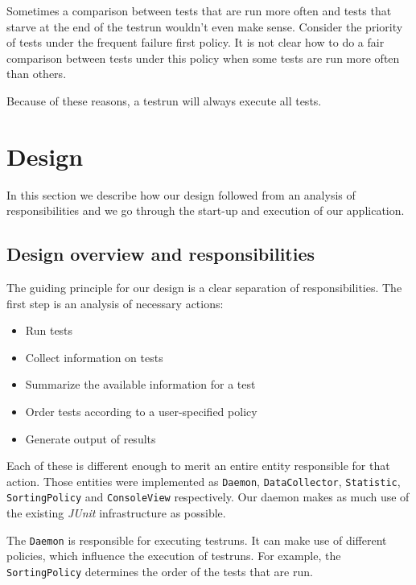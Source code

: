\documentclass[i2]{oss}
\newcommand{\class}[1]{\texttt{#1}}
\newcommand{\junit}{\emph{JUnit }}
\begin{document}
Sometimes a comparison between tests that are run more often and tests that starve at the end of the testrun wouldn't even make sense.
Consider the priority of tests under the frequent failure first policy.
It is not clear how to do a fair comparison between tests under this policy when some tests are run more often than others.

Because of these reasons, a testrun will always execute all tests.

\section{Design}
\label{ssec:design}

In this section we describe how our design followed from an analysis
of responsibilities and we go through the start-up and execution of 
our application.

\subsection{Design overview and responsibilities}
\label{subssec: Design overview}

The guiding principle for our design is a clear separation of 
responsibilities. The first step is an analysis of necessary actions:

\begin{itemize}
	\item Run tests
    \item Collect information on tests
    \item Summarize the available information for a test
    \item Order tests according to a user-specified policy
    \item Generate output of results
\end{itemize}

Each of these is different enough to merit an entire entity responsible 
for that action. Those entities were implemented as \class{Daemon},
\class{DataCollector}, \class{Statistic}, \class{SortingPolicy} and
\class{ConsoleView} respectively. Our daemon makes as much use of the 
existing \junit infrastructure as possible. 

The \class{Daemon} is responsible for executing testruns.
It can make use of different policies, which influence the execution of testruns.
For example, the \class{SortingPolicy} determines the order of the tests that are run.
\end{document}
